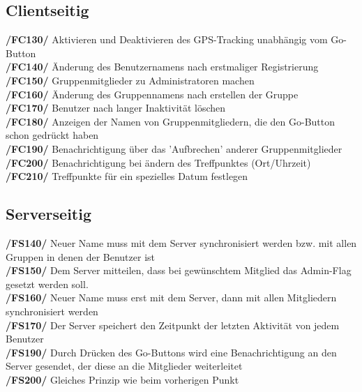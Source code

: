 \subsection{Clientseitig}
     \textbf{/FC130/} Aktivieren und Deaktivieren des GPS-Tracking unabhängig vom Go-Button\\
     \textbf{/FC140/} Änderung des Benutzernamens nach erstmaliger Registrierung\\
     \textbf{/FC150/} Gruppenmitglieder zu Administratoren machen                \\
     \textbf{/FC160/} Änderung des Gruppennamens nach erstellen der Gruppe        \\
     \textbf{/FC170/} Benutzer nach langer Inaktivität löschen                     \\
     \textbf{/FC180/} Anzeigen der Namen von Gruppenmitgliedern, die den Go-Button schon gedrückt haben\\
     \textbf{/FC190/} Benachrichtigung über das 'Aufbrechen' anderer Gruppenmitglieder\\
     \textbf{/FC200/} Benachrichtigung bei ändern des Treffpunktes (Ort/Uhrzeit)\\
     \textbf{/FC210/} Treffpunkte für ein spezielles Datum festlegen\\
\subsection{Serverseitig}
     \textbf{/FS140/} Neuer Name muss mit dem Server synchronisiert werden bzw. mit allen Gruppen in denen der Benutzer ist\\
     \textbf{/FS150/} Dem Server mitteilen, dass bei gewünschtem Mitglied das Admin-Flag gesetzt werden soll.\\
     \textbf{/FS160/} Neuer Name muss erst mit dem Server, dann mit allen Mitgliedern synchronisiert werden\\
     \textbf{/FS170/} Der Server speichert den Zeitpunkt der letzten Aktivität von jedem Benutzer\\
     \textbf{/FS190/} Durch Drücken des Go-Buttons wird eine Benachrichtigung an den Server gesendet, der diese an die Mitglieder weiterleitet\\
     \textbf{/FS200/} Gleiches Prinzip wie beim vorherigen Punkt\\
